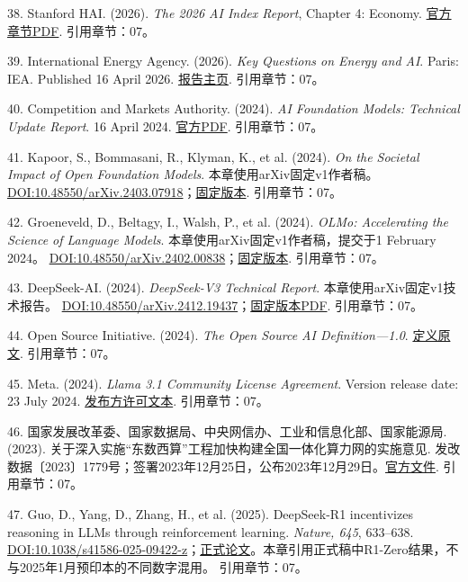 \documentclass[UTF8,fontset=windows,12pt,a4paper,oneside,openany]{ctexbook}
\begin{document}
38. Stanford HAI. (2026). \emph{The 2026 AI Index Report}, Chapter 4: Economy. \href{https://hai.stanford.edu/assets/files/ai_index_report_2026_chapter_4_economy.pdf}{官方章节PDF}.
引用章节：07。

39. International Energy Agency. (2026). \emph{Key Questions on Energy and AI}. Paris: IEA. Published 16 April 2026. \href{https://www.iea.org/reports/key-questions-on-energy-and-ai}{报告主页}.
引用章节：07。

40. Competition and Markets Authority. (2024). \emph{AI Foundation Models: Technical Update Report}. 16 April 2024. \href{https://assets.publishing.service.gov.uk/media/661e5a4c7469198185bd3d62/AI_Foundation_Models_technical_update_report.pdf}{官方PDF}.
引用章节：07。

41. Kapoor, S., Bommasani, R., Klyman, K., et al. (2024). \emph{On the Societal Impact of Open Foundation Models}. 本章使用arXiv固定v1作者稿。 \href{https://doi.org/10.48550/arXiv.2403.07918}{DOI:10.48550/arXiv.2403.07918}；\href{https://arxiv.org/html/2403.07918v1}{固定版本}.
引用章节：07。

42. Groeneveld, D., Beltagy, I., Walsh, P., et al. (2024). \emph{OLMo: Accelerating the Science of Language Models}. 本章使用arXiv固定v1作者稿，提交于1 February 2024。 \href{https://doi.org/10.48550/arXiv.2402.00838}{DOI:10.48550/arXiv.2402.00838}；\href{https://arxiv.org/html/2402.00838v1}{固定版本}.
引用章节：07。

43. DeepSeek-AI. (2024). \emph{DeepSeek-V3 Technical Report}. 本章使用arXiv固定v1技术报告。 \href{https://doi.org/10.48550/arXiv.2412.19437}{DOI:10.48550/arXiv.2412.19437}；\href{https://arxiv.org/pdf/2412.19437v1}{固定版本PDF}.
引用章节：07。

44. Open Source Initiative. (2024). \emph{The Open Source AI Definition—1.0}. \href{https://opensource.org/ai/open-source-ai-definition}{定义原文}.
引用章节：07。

45. Meta. (2024). \emph{Llama 3.1 Community License Agreement}. Version release date: 23 July 2024. \href{https://raw.githubusercontent.com/meta-llama/llama-models/main/models/llama3_1/LICENSE}{发布方许可文本}.
引用章节：07。

46. 国家发展改革委、国家数据局、中央网信办、工业和信息化部、国家能源局. (2023). 关于深入实施“东数西算”工程加快构建全国一体化算力网的实施意见. 发改数据〔2023〕1779号；签署2023年12月25日，公布2023年12月29日。\href{https://www.ndrc.gov.cn/xxgk/zcfb/tz/202312/t20231229_1363000.html}{官方文件}.
引用章节：07。

47. Guo, D., Yang, D., Zhang, H., et al. (2025). DeepSeek-R1 incentivizes reasoning in LLMs through reinforcement learning. \emph{Nature, 645}, 633–638. \href{https://doi.org/10.1038/s41586-025-09422-z}{DOI:10.1038/s41586-025-09422-z}；\href{https://www.nature.com/articles/s41586-025-09422-z}{正式论文}。本章引用正式稿中R1-Zero结果，不与2025年1月预印本的不同数字混用。
引用章节：07。
\end{document}
